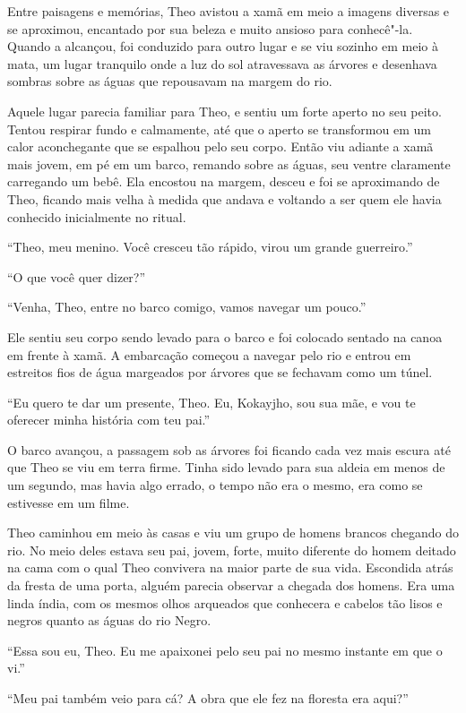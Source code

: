 Entre paisagens e memórias, Theo avistou a xamã em meio a imagens
diversas e se aproximou, encantado por sua beleza e muito ansioso para
conhecê"-la. Quando a alcançou, foi conduzido para outro lugar e se viu
sozinho em meio à mata, um lugar tranquilo onde a luz do sol atravessava
as árvores e desenhava sombras sobre as águas que repousavam na margem
do rio.

Aquele lugar parecia familiar para Theo, e sentiu um forte aperto no
seu peito. Tentou respirar fundo e calmamente, até que o aperto se
transformou em um calor aconchegante que se espalhou pelo seu corpo.
Então viu adiante a xamã mais jovem, em pé em um barco, remando sobre as
águas, seu ventre claramente carregando um bebê. Ela encostou na margem,
desceu e foi se aproximando de Theo, ficando mais velha à medida que
andava e voltando a ser quem ele havia conhecido inicialmente no ritual.

``Theo, meu menino. Você cresceu tão rápido, virou um grande
guerreiro.''

``O que você quer dizer?''

``Venha, Theo, entre no barco comigo, vamos navegar um pouco.''

Ele sentiu seu corpo sendo levado para o barco e foi colocado sentado na
canoa em frente à xamã. A embarcação começou a navegar pelo rio e entrou
em estreitos fios de água margeados por árvores que se fechavam como um
túnel.

``Eu quero te dar um presente, Theo. Eu, Kokayjho, sou sua mãe, e vou te
oferecer minha história com teu pai.''

O barco avançou, a passagem sob as árvores foi ficando cada vez mais
escura até que Theo se viu em terra firme. Tinha sido levado para sua
aldeia em menos de um segundo, mas havia algo errado, o tempo não era o
mesmo, era como se estivesse em um filme.

Theo caminhou em meio às casas e viu um grupo de homens brancos chegando
do rio. No meio deles estava seu pai, jovem, forte, muito diferente do
homem deitado na cama com o qual Theo convivera na maior parte de sua
vida. Escondida atrás da fresta de uma porta, alguém parecia observar a
chegada dos homens. Era uma linda índia, com os mesmos olhos arqueados
que conhecera e cabelos tão lisos e negros quanto as águas do rio Negro.

``Essa sou eu, Theo. Eu me apaixonei pelo seu pai no mesmo instante em
que o vi.''

``Meu pai também veio para cá? A obra que ele fez na floresta era
aqui?''

